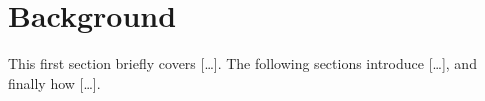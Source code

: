 \section{Background}
\label{sec:background}
This first section briefly covers [\dots]. The following sections introduce [\dots], and finally how [\dots].









